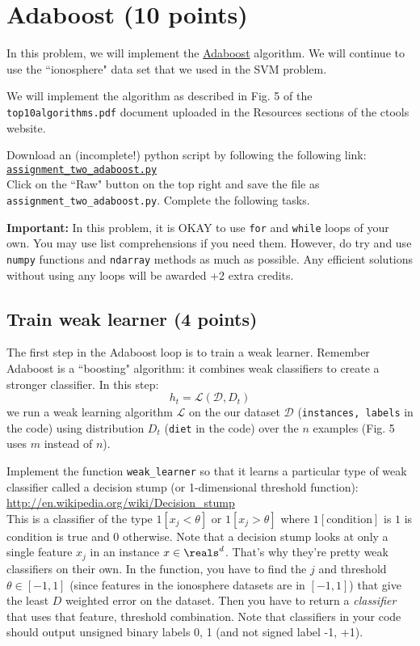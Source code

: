\documentclass{article}
\begin{document}
\section{Adaboost (10 points)}

In this problem, we will implement the \href{http://en.wikipedia.org/wiki/AdaBoost}{Adaboost} algorithm.
We will continue to use the ``ionosphere" data set that we used in the SVM problem.

We will implement the algorithm as described in Fig. 5 of the {\tt top10algorithms.pdf} document uploaded in the Resources sections 
of the ctools website.

Download an (incomplete!) python script by following the following
link:\\
\href{https://github.com/ambujtewari/stats607a-fall2014/blob/master/homeworks/assignment\_two\_adaboost.py}{\tt assignment\_two\_adaboost.py} \\
Click on the ``Raw" button on the top right and save the file as {\tt assignment\_two\_adaboost.py}.
Complete the following tasks.

{\bf Important:} In this problem, it is OKAY to use {\tt for} and {\tt while} loops of your own. You may use list comprehensions if you need them.
However, do try and use {\tt numpy} functions and {\tt ndarray} methods as much as possible. Any efficient solutions without using any loops
will be awarded +2 extra credits.

\subsection{Train weak learner (4 points)}

The first step in the Adaboost loop is to train a weak learner. Remember Adaboost is a ``boosting" algorithm: it combines weak classifiers 
to create a stronger classifier. In this step:
$$
h_t = \mathcal{L}(\mathcal{D}, D_t)
$$
we run a weak learning algorithm $\mathcal{L}$ on the our dataset $\mathcal{D}$ ({\tt instances, labels} in the code) using distribution
$D_t$ ({\tt diet} in the code) over the $n$ examples (Fig. 5 uses $m$ instead of $n$).

Implement the function {\tt weak\_learner} so that it learns a particular type of weak classifier called a decision stump (or 1-dimensional
threshold function):\\
\url{http://en.wikipedia.org/wiki/Decision\_stump}\\
This is a classifier of the type $1[x_j < \theta]$ or $1[x_j > \theta]$ where $1[\text{condition}]$ is $1$ is condition is true and $0$ otherwise.
Note that a decision stump looks at only a single feature $x_j$ in an instance $x \in \reals^d$. That's why they're pretty weak classifiers
on their own. In the function, you have to find the $j$ and threshold $\theta \in [-1,1]$ (since features in the ionosphere
datasets are in $[-1,1]$) that give the least $D$ weighted error on the dataset. Then you have to return a \emph{classifier}
that uses that feature, threshold combination. Note that classifiers in your code should output unsigned binary labels 0, 1
(and not signed label -1, +1).
\end{document}
